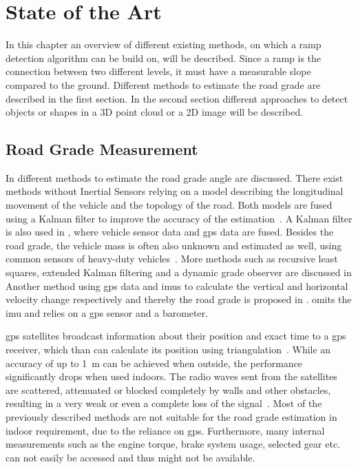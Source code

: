 \chapter{State of the Art}
\label{ch:StateOfTheArt}

In this chapter an overview of different existing methods, on which a ramp detection algorithm can be build on, will be described.
Since a ramp is the connection between two different levels, it must have a measurable slope compared to the ground.
Different methods to estimate the road grade are described in the first section.
In the second section different approaches to detect objects or shapes in a 3D point cloud or a 2D image will be described.


\section{Road Grade Measurement}
In \cite{Jauch2018} different methods to estimate the road grade angle are discussed.
There exist methods without Inertial Sensors relying on a model describing the longitudinal movement of the vehicle and the topology of the road.
Both models are fused using a Kalman filter to improve the accuracy of the estimation~\cite{Sahlholm2007}.
A Kalman filter is also used in \cite{Sahlholm2010}, where vehicle sensor data and \gls{gps} data are fused.
Besides the road grade, the vehicle mass is often also unknown and estimated as well, using common sensors of heavy-duty vehicles~\cite{Sahlholm2010, Maleej2014}.
More methods such as recursive least squares, extended Kalman filtering and a dynamic grade observer are discussed in \cite{Kidambi2014}
Another method using \gls{gps} data and \glspl{imu} to calculate the vertical and horizontal velocity change respectively and thereby the road grade is proposed in \cite{Ryu2004}.
\cite{YazdaniBoroujeni2014} omits the \gls{imu} and relies on a \gls{gps} sensor and a barometer.

\gls{gps} satellites broadcast information about their position and exact time to a \gls{gps} receiver, which than can calculate its position using triangulation~\cite{Mainetti2014}.
While an accuracy of up to \SI{1}{\metre} can be achieved when outside, the performance significantly drops when used indoors.
The radio waves sent from the satellites are scattered, attenuated or blocked completely by walls and other obstacles, resulting in a very weak or even a complete loss of the signal~\cite{Ozdenizci2015}.
Most of the previously described methods are not suitable for the road grade estimation in indoor requirement, due to the reliance on \gls{gps}.
Furthermore, many internal measurements such as the engine torque, brake system usage, selected gear etc. can not easily be accessed and thus might not be available.

